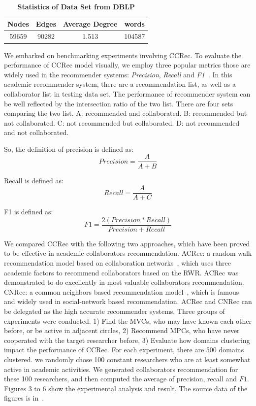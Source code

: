 \documentclass[10pt,letterpaper]{article}
\begin{document}
\begin{table}[!ht]
\begin{adjustwidth}{-2.25in}{0in}
\caption{\bf{Statistics of Data Set from DBLP}}
\label{tab:statdblp}
\begin{tabular}{|c|c|c|c|}\hline
Nodes&Edges&Average Degree&words\\\hline
59659 &90282 &1.513 &104587\\\hline
\end{tabular}
\end{adjustwidth}
\end{table}

We embarked on benchmarking experiments involving CCRec. To evaluate the performance of CCRec model visually, we employ three popular metrics those are widely used in the recommender systems: \emph{Precision}, \emph{Recall} and \emph{F1}~\cite{shani2011evaluating}. In this academic recommender system, there are a recommendation list, as well as a collaborator list in testing data set. The performance of recommender system can be well reflected by the intersection ratio of the two list. There are four sets comparing the two list. A: recommended and collaborated. B: recommended but not collaborated. C: not recommended but collaborated. D: not recommended and not collaborated.

So, the definition of precision is defined as:
\begin{equation}
\label{equ7}
Precision=\frac{A}{A+B}
\end{equation}

Recall is defined as:
\begin{equation}
\label{equ8}
Recall=\frac{A}{A+C}
\end{equation}

F1 is defined as:
\begin{equation}
\label{equ9}
F1=\frac{2(Precision \ast Recall)}{Precision + Recall}
\end{equation}

We compared CCRec with the following two approaches, which have been proved to be effective in academic collaborators recommendation. ACRec: a random walk recommendation model based on collaboration networks~\cite{li2014acrec}, which uses three academic factors to recommend collaborators based on the RWR. ACRec was demonstrated to do excellently in most valuable collaborators recommendation. CNRec: a common neighbors based recommendation model~\cite{lopes2010collaboration}, which is famous and widely used in social-network based recommendation. ACRec and CNRec can be delegated as the high accurate recommender systems. Three groups of experiments were conducted. 1) Find the MVCs, who may have known each other before, or be active in adjacent circles, 2) Recommend MPCs, who have never cooperated with the target researcher before, 3) Evaluate how domains clustering impact the performance of CCRec. For each experiment, there are 500 domains clustered. we randomly chose 100 constant researchers who are at least somewhat active in academic activities. We generated collaborators recommendation for these 100 researchers, and then computed the average of precision, recall and $F1$. Figures 3 to 6 show the experimental analysis and result. The source data of the figures is in~.
\end{document}
